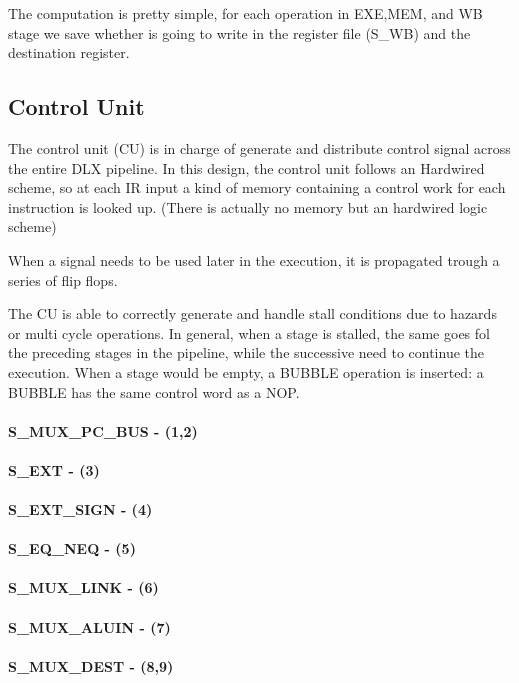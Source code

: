 \documentclass[12pt]{article}
\begin{document}
The computation is pretty simple, for each operation in EXE,MEM, and WB stage we save whether is going to write in the register file (S\_WB) and the destination register.


\subsection{Control Unit}
The control unit (CU) is in charge of generate and distribute control signal across the entire DLX pipeline.
In this design, the control unit follows an Hardwired scheme, so at each IR input a kind of memory containing a control work for each instruction is looked up. (There is actually no memory but an hardwired logic scheme)

When a signal needs to be used later in the execution, it is propagated trough a series of flip flops.

The CU is able to correctly generate and handle stall conditions due to hazards or multi cycle operations. In general, when a stage is stalled, the same goes fol the preceding stages in the pipeline, while the successive need to continue the execution. When a stage would be empty, a BUBBLE operation is inserted: a BUBBLE has the same control word as a NOP.

\paragraph{S\_MUX\_PC\_BUS - (1,2)}
\paragraph{S\_EXT - (3)}
\paragraph{S\_EXT\_SIGN - (4)}
\paragraph{S\_EQ\_NEQ - (5)}
\paragraph{S\_MUX\_LINK - (6)}
\paragraph{S\_MUX\_ALUIN - (7)}
\paragraph{S\_MUX\_DEST - (8,9)}
\end{document}
